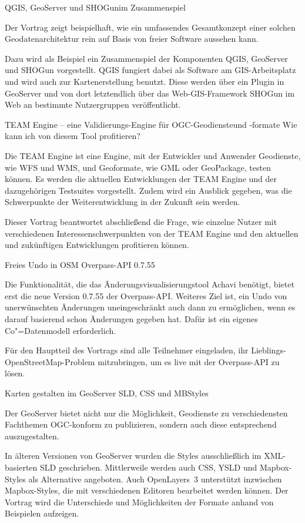 %
{QGIS, GeoServer und SHOGun\linebreak im Zusammenspiel}%
{}%
{%
Der Vortrag zeigt beispielhaft, wie ein umfassendes Gesamtkonzept einer solchen
Geodatenarchitektur rein auf Basis von freier Software aussehen kann.

Dazu wird als Beispiel ein Zusammenspiel der Komponenten QGIS, GeoServer und
SHOGun vorgestellt. QGIS fungiert dabei als Software am GIS-Arbeitsplatz und
wird auch zur Kartenerstellung benutzt. Diese werden über ein Plugin in
GeoServer und von dort letztendlich über das Web-GIS-Framework SHOGun im Web an
bestimmte Nutzergruppen veröffentlicht.%
}

%
{TEAM Engine -- eine Validierungs-Engine für OGC-Geodienste\linebreak und \mbox{-formate}\vspace{0.2em}}%
{Wie kann ich von diesem Tool profitieren?}%
{%
Die TEAM Engine ist eine Engine, mit der Entwickler und Anwender Geodienste,
wie WFS und WMS, und Geoformate, wie GML oder GeoPackage, testen können.  Es
werden die aktuellen Entwicklungen der TEAM Engine und der dazugehörigen
Testsuites vorgestellt. Zudem wird ein Ausblick gegeben, was die Schwerpunkte
der Weiterentwicklung in der Zukunft sein werden.

Dieser Vortrag beantwortet abschließend die Frage, wie einzelne Nutzer mit
verschiedenen Interessenschwerpunkten von der TEAM Engine und den aktuellen und
zukünftigen Entwicklungen profitieren können.%
}

%
{Freies Undo in OSM}%
{Overpass-API 0.7.55}%
{%
Die Funktionalität, die das Änderungsvisualisierungstool Achavi benötigt, bietet erst die neue Version 0.7.55
der Overpass-API. Weiteres Ziel ist, ein Undo von unerwünschten Änderungen
uneingeschränkt auch dann zu ermöglichen, wenn es darauf basierend schon
Änderungen gegeben hat. Dafür ist ein eigenes Co"=Datenmodell erforderlich.

Für den Hauptteil des Vortrags sind alle Teilnehmer eingeladen, ihr
Lieblings-OpenStreetMap-Problem mitzubringen, um es live mit der Overpass-API zu lösen.%
}

%
{Karten gestalten im GeoServer}%
{SLD, CSS und MBStyles}%
{%
Der GeoServer bietet nicht nur die Möglichkeit, Geodienste zu verschiedensten
Fachthemen OGC-konform zu publizieren, sondern auch diese entsprechend
auszugestalten.

In älteren Versionen von GeoServer wurden die Styles ausschließlich im
XML-basierten SLD geschrieben. Mittlerweile werden auch CSS, YSLD und
Mapbox-Styles als Alternative angeboten.  Auch OpenLayers~3 unterstützt
inzwischen Mapbox-Styles, die mit verschiedenen Editoren bearbeitet werden
können. Der Vortrag wird die Unterschiede und Möglichkeiten der Formate anhand
von Beispielen aufzeigen.%
}

